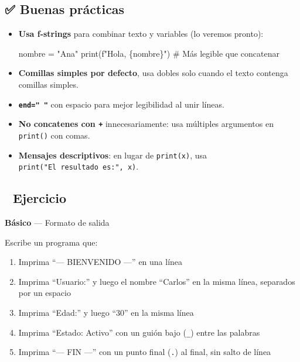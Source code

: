\documentclass[
  doc,
  floatsintext,
  longtable,
  a4paper,
  nolmodern,
  notxfonts,
  notimes,
  12pt,
  colorlinks=true,linkcolor=blue,citecolor=blue,urlcolor=blue]{apa7}
\newenvironment{Shaded}{\begin{snugshade}}{\end{snugshade}}
\newcommand{\BuiltInTok}[1]{\textcolor[rgb]{0.00,0.23,0.31}{#1}}
\newcommand{\CommentTok}[1]{\textcolor[rgb]{0.37,0.37,0.37}{#1}}
\newcommand{\NormalTok}[1]{\textcolor[rgb]{0.00,0.23,0.31}{#1}}
\newcommand{\OperatorTok}[1]{\textcolor[rgb]{0.37,0.37,0.37}{#1}}
\newcommand{\SpecialCharTok}[1]{\textcolor[rgb]{0.37,0.37,0.37}{#1}}
\newcommand{\SpecialStringTok}[1]{\textcolor[rgb]{0.13,0.47,0.30}{#1}}
\newcommand{\StringTok}[1]{\textcolor[rgb]{0.13,0.47,0.30}{#1}}
\providecommand{\tightlist}{%
  \setlength{\itemsep}{0pt}\setlength{\parskip}{0pt}}
\begin{document}
\subsection{✅ Buenas prácticas}\label{buenas-pruxe1cticas}

\begin{itemize}
\item
  \textbf{Usa f-strings} para combinar texto y variables (lo veremos
  pronto):

\begin{Shaded}
\begin{Highlighting}[]
\NormalTok{nombre }\OperatorTok{=} \StringTok{"Ana"}
\BuiltInTok{print}\NormalTok{(}\SpecialStringTok{f"Hola, }\SpecialCharTok{\{}\NormalTok{nombre}\SpecialCharTok{\}}\SpecialStringTok{"}\NormalTok{)  }\CommentTok{\# Más legible que concatenar}
\end{Highlighting}
\end{Shaded}
\item
  \textbf{Comillas simples por defecto}, usa dobles solo cuando el texto
  contenga comillas simples.
\item
  \textbf{\texttt{end="\ "}} con espacio para mejor legibilidad al unir
  líneas.
\item
  \textbf{No concatenes con \texttt{+}} innecesariamente: usa múltiples
  argumentos en \texttt{print()} con comas.
\item
  \textbf{Mensajes descriptivos}: en lugar de \texttt{print(x)}, usa
  \texttt{print("El\ resultado\ es:",\ x)}.
\end{itemize}

\subsection{📝 Ejercicio}\label{ejercicio}

\textbf{Básico} --- Formato de salida

Escribe un programa que:

\begin{enumerate}
\def\labelenumi{\arabic{enumi}.}
\tightlist
\item
  Imprima ``--- BIENVENIDO ---'' en una línea
\item
  Imprima ``Usuario:'' y luego el nombre ``Carlos'' en la misma línea,
  separados por un espacio
\item
  Imprima ``Edad:'' y luego ``30'' en la misma línea
\item
  Imprima ``Estado: Activo'' con un guión bajo (\texttt{\_}) entre las
  palabras
\item
  Imprima ``--- FIN ---'' con un punto final (\texttt{.}) al final, sin
  salto de línea
\end{enumerate}
\end{document}
